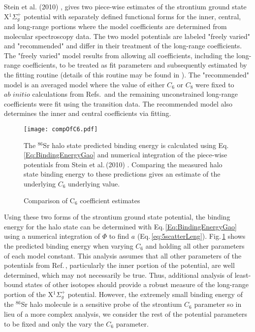 Stein et al. (2010) \cite{Stein2010}, gives two piece-wise estimates of the strontium ground state X$^1\Sigma_g^+$ potential with separately defined functional forms for the inner, central, and long-range portions where the model coefficients are determined from molecular spectroscopy data.
The two model potentials are labeled "freely varied" and "recommended" and differ in their treatment of the long-range coefficients.
The "freely varied" model results from allowing all coefficients, including the long-range coefficients, to be treated as fit parameters and subsequently estimated by the fitting routine (details of this routine may be found in \cite{Stein2010}).
The "recommended" model is an averaged model where the value of either $C_6$ or $C_8$ were fixed to $\textit{ab initio}$ calculations from Refs.\,\cite{Porsev2006, ykt06} and the remaining unconstrained long-range coefficients were fit using the transition data.
The recommended model also determines the inner and central coefficients via fitting.


	\begin{figure} 
	\centerline{
	  \texttt{[image: compOfC6.pdf]}}
	  \caption{Comparison of C$_6$ coefficient estimates}{The $^{86}$Sr halo state predicted binding energy is calculated using Eq.\,\ref{Eq:BindingEnergyGao} and numerical integration of the piece-wise potentials from Stein et al.\,(2010) \cite{Stein2010}. Comparing the measured halo state binding energy to these predictions gives an estimate of the underlying $C_6$ underlying value.}
	  \label{fig:c6estimates}
	\end{figure}
Using these two forms of the strontium ground state potential, the binding energy for the halo state can be determined with Eq.\,\ref{Eq:BindingEnergyGao} using a numerical integration of $\Phi$ to find $a$ (Eq.\,\ref{eq:5scatterLeng}).
Fig.\,\ref{fig:c6estimates} shows the predicted binding energy when varying $C_6$ and holding all other parameters of each model constant.
This analysis assumes that all other parameters of the potentials from Ref.\,\cite{Stein2010}, particularly the inner portion of the potential, are well determined, which may not necessarily be true.
Thus, additional analysis of least-bound states of other isotopes should provide a robust measure of the long-range portion of the X$^1\Sigma_g^+$ potential.
However, the extremely small binding energy of the $^{86}$Sr halo molecule is a sensitive probe of the strontium $C_6$ parameter so in lieu of a more complex analysis, we consider the rest of the potential parameters to be fixed and only the vary the $C_6$ parameter.

